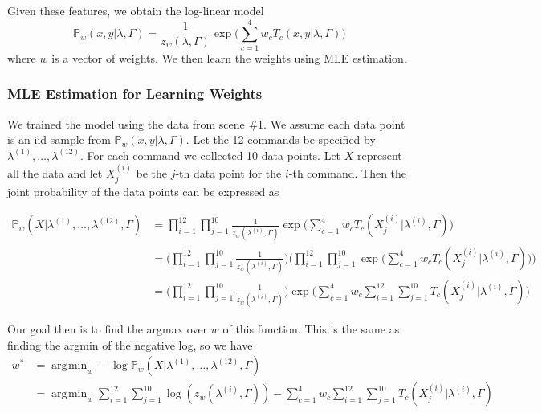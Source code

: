 \documentclass[12pt,letterpaper]{article}
\newcommand\prob{\mathbb{P}}
\DeclareMathOperator*{\argmin}{\arg\!\min}
\begin{document}
Given these features, we obtain the log-linear model
\[
\mathbb{P}_w(x, y|\lambda, \Gamma) = \frac{1}{z_w(\lambda, \Gamma)}\exp\bigg(\sum_{c = 1}^4w_cT_c(x, y|\lambda, \Gamma)\bigg)
\]
where $w$ is a vector of weights. We then learn the weights using MLE estimation.

\subsubsection{MLE Estimation for Learning Weights}
We trained the model using the data from scene \#1. We assume each data point is an iid sample from $\prob_w(x, y|\lambda, \Gamma)$. Let the 12 commands be specified by $\lambda^{(1)}, \ldots, \lambda^{(12)}$. For each command we collected 10 data points. Let $X$ represent all the data and let $X^{(i)}_j$ be the $j$-th data point for the $i$-th command. Then the joint probability of the data points can be expressed as

\begin{equation*}
\begin{split}
\prob_w(X|\lambda^{(1)}, \ldots, \lambda^{(12)}, \Gamma) &= \prod_{i = 1}^{12}\prod_{j = 1}^{10} \frac{1}{z_w(\lambda^{(i)}, \Gamma)}\exp\bigg(\sum_{c = 1}^4w_cT_c(X^{(i)}_j|\lambda^{(i)}, \Gamma)\bigg) \\
&= \bigg(\prod_{i = 1}^{12}\prod_{j = 1}^{10} \frac{1}{z_w(\lambda^{(i)}, \Gamma)}\bigg)\bigg(\prod_{i = 1}^{12}\prod_{j = 1}^{10}\exp\bigg(\sum_{c = 1}^4w_cT_c(X^{(i)}_j|\lambda^{(i)}, \Gamma)\bigg)\bigg) \\
&= \bigg(\prod_{i = 1}^{12}\prod_{j = 1}^{10} \frac{1}{z_w(\lambda^{(i)}, \Gamma)}\bigg)\exp\bigg(\sum_{c = 1}^4w_c\sum_{i = 1}^{12}\sum_{j = 1}^{10}T_c(X^{(i)}_j|\lambda^{(i)}, \Gamma)\bigg)
\end{split}
\end{equation*}

Our goal then is to find the argmax over $w$ of this function. This is the same as finding the argmin of the negative log, so we have
\begin{equation*}
\begin{split}
w^* &= \argmin_w -\log\prob_w(X|\lambda^{(1)}, \ldots, \lambda^{(12)}, \Gamma) \\
&= \argmin_w \sum_{i = 1}^{12}\sum_{j = 1}^{10}\log(z_w(\lambda^{(i)}, \Gamma)) - \sum_{c = 1}^4w_c\sum_{i = 1}^{12}\sum_{j = 1}^{10}T_c(X^{(i)}_j|\lambda^{(i)}, \Gamma)
\end{split}
\end{equation*}
\end{document}
